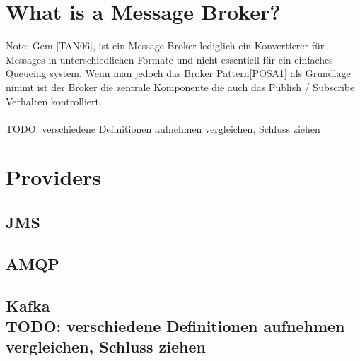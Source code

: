 \section{What is a Message Broker?}
Note: Gem [TAN06], ist ein Message Broker lediglich ein Konvertierer für
Messages in unterschiedlichen Formate und nicht essentiell für ein einfaches
Queueing system. Wenn man jedoch das Broker Pattern[POSA1] als Grundlage nimmt
ist der Broker die zentrale Komponente die auch das Publish / Subscribe
Verhalten kontrolliert. 
\\
\\
TODO: verschiedene Definitionen aufnehmen vergleichen, Schluss ziehen
\section{Providers}
\subsection{JMS}

\subsection{AMQP}
\subsection{Kafka
\\
TODO: verschiedene Definitionen aufnehmen vergleichen, Schluss ziehen}
